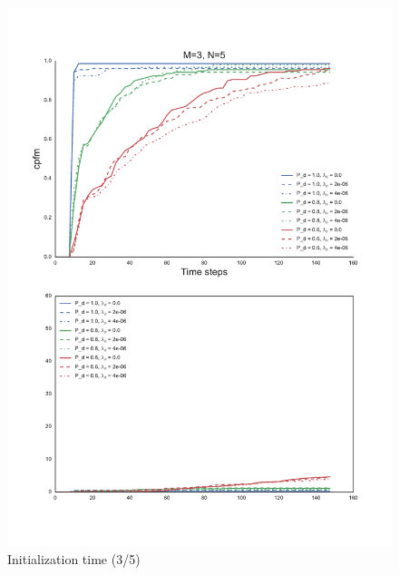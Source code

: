 \begin{figure}
\centering
\includegraphics[height = .9\textheight]{Figures/plots/Scenario1_Init-Time(3-5).pdf}
\caption{Initialization time (3/5)}\label{fig:init_time_3-5}
\end{figure}

